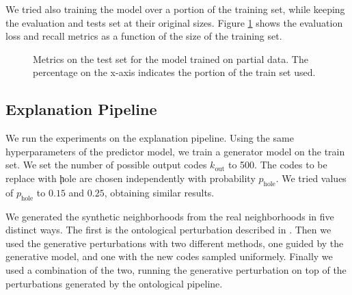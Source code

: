 \documentclass[]{marticle}
\begin{document}
We tried also training the model over a portion of the training set, while keeping the evaluation
and tests set at their original sizes. Figure \ref{fig:kelso-partial-train} shows the evaluation
loss and recall metrics as a function of the size of the training set.

\begin{figure}[!tb] 
\caption{Metrics on the test set for the model trained on partial data. The percentage on the x-axis
indicates the portion of the train set used. }
\label{fig:kelso-partial-train} 
\end{figure}

\subsection{Explanation Pipeline}

We run the experiments on the explanation pipeline. Using the same hyperparameters of the predictor
model, we train a generator model on the train set. We set the number of possible output codes
$k_\text{out}$ to 500. The codes to be replace with \c{hole} are chosen independently with
probability $p_\text{hole}$. We tried values of $p_\text{hole}$ to $0.15$ and $0.25$, obtaining
similar results.

We generated the synthetic neighborhoods from the real neighborhoods in five distinct ways. The
first is the ontological perturbation described in \cite{panigutti-xai}. Then we used the generative
perturbations with two different methods, one guided by the generative model, and one with the new
codes sampled uniformely. Finally we used a combination of the two, running the generative
perturbation on top of the perturbations generated by the ontological pipeline.
\end{document}

